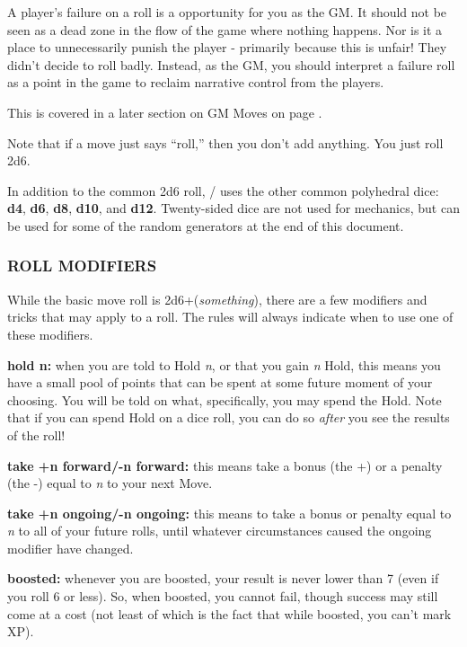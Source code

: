\documentclass[oneside,10pt]{article}
\begin{document}
\begin{multicols}{2}
\begin{gmtip}
A player's failure on a roll is a opportunity for you as the
GM. It should not be seen as a dead zone in the flow of the game where
nothing happens. Nor is it a place to unnecessarily punish the player - primarily
because this is unfair!  They didn't decide to roll badly. Instead, as
the GM, you should interpret a failure roll as a point in the game to
reclaim narrative control from the players. 

This is covered in a later section on GM Moves on page
\pageref{gmmoves}. 
\end{gmtip}

Note that if a move just says ``roll,'' then you don’t add anything. You just roll 2d6.

In addition to the common 2d6 roll, \SW/  uses the 
other common polyhedral dice: \textbf{d4}, \textbf{d6}, \textbf{d8}, \textbf{d10}, and \textbf{d12}. 
Twenty-sided dice are not used for mechanics, but can be 
used for some of the random generators at the end of this 
document. 

\subsubsection{ROLL MODIFIERS }
\label{rollmods}
While the basic move roll is 2d6+(\textit{something}), there are a few 
modifiers and tricks that may apply to a roll. The rules will 
always indicate when to use one of these
modifiers. 

\begin{dent}
\textbf{hold n:} when you are told to Hold \textit{n}, or that you gain \textit{n} 
Hold, this means you have a small pool of points that can 
be spent at some future moment of your choosing. You 
will be told on what, specifically, you may spend the Hold. 
Note that if you can spend Hold on a dice roll, you can do 
so \textit{after} you see the results of the roll! 

\textbf{take +n forward/-n forward:} this means take a bonus
(the +) or a penalty (the -) equal to \textit{n} to your
next Move.

\textbf{take +n ongoing/-n ongoing:} this means to take a bonus or penalty equal to \textit{n} to all of your future rolls, until
whatever circumstances caused the ongoing modifier have
changed.

\textbf{boosted:} whenever you are boosted, your result is never
lower than 7 (even if you roll 6 or less). So, when boosted,
you cannot fail, though success may still come at a cost
(not least of which is the fact that while boosted, you can’t
mark XP).


\end{dent}
\end{multicols}
\end{document}
